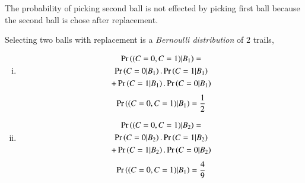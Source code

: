 \documentclass[journal,12pt,twocolumn]{IEEEtran}
\begin{document}
The probability of picking second ball is not effected by picking first ball because the second ball is chose after replacement.

\vspace{0.1in}

Selecting two balls with replacement is a \textit{Bernoulli distribution} of $2$ trails,
\begin{table}
\centering
\caption{Table of no. of ways of selecting two different coloured balls}
\end{table}

\begin{table}
\centering
\caption{Table of variables description}
\label{Table4}
\end{table}

\begin{enumerate}[(i)]
\item
\begin{multline}
    \Pr\left((C=0,C=1)|B_1\right)=\\\Pr\left(C=0|B_1\right).\Pr\left(C=1|B_1\right)\\+\Pr\left(C=1|B_1\right).\Pr\left(C=0|B_1\right)
\end{multline}
\begin{align}
    \Pr\left((C=0,C=1)|B_1\right)=\frac{1}{2}
\end{align}
\item
\begin{multline}
    \Pr\left((C=0,C=1)|B_2\right)=\\\Pr\left(C=0|B_2\right).\Pr\left(C=1|B_2\right)\\+\Pr\left(C=1|B_2\right).\Pr\left(C=0|B_2\right)
\end{multline}
\begin{align}
    \Pr\left((C=0,C=1)|B_1\right)=\frac{4}{9}
\end{align}
\end{enumerate}
\end{document}
